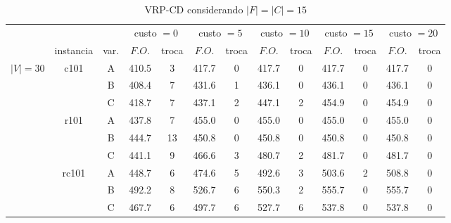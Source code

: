 \documentclass[12pt]{article}
\begin{document}
\begin{table}[!htb]
\centering
\footnotesize
\begin{tabular}{|c|c|c|c|c|c|c|c|c|c|c|c|c|}
\cline{4-13}
\multicolumn{3}{c}{} & \multicolumn{2}{|c}{custo $=0$} & \multicolumn{2}{|c|}{custo $=5$} & \multicolumn{2}{c|}{custo $=10$} & \multicolumn{2}{c|}{custo $=15$} & \multicolumn{2}{|c|}{custo $=20$}\\
\cline{2-13}
\multicolumn{1}{c}{} & \multicolumn{1}{|c}{instancia} & \multicolumn{1}{|c|}{var.} & \multicolumn{1}{|c|}{$F.O.$} & \multicolumn{1}{|c|}{troca} & \multicolumn{1}{|c|}{$F.O.$} & \multicolumn{1}{|c|}{troca} & \multicolumn{1}{|c|}{$F.O.$} & \multicolumn{1}{|c|}{troca} & \multicolumn{1}{|c|}{$F.O.$} & \multicolumn{1}{|c|}{troca} & \multicolumn{1}{|c|}{$F.O.$} & \multicolumn{1}{|c|}{troca} \\
\hline
\multirow{9}{*}{$|V|=30$}
& \multirow{3}{*}{c101} & A & 410.5 & 3 & 417.7 & 0 & 417.7 & 0 & 417.7 & 0 & 417.7 & 0 \\
\cline{3-13}
& \multirow{3}{*}{} & B & 408.4 & 7 & 431.6 & 1 & 436.1 & 0 & 436.1 & 0 & 436.1 & 0 \\
\cline{3-13}
& \multirow{3}{*}{} & C & 418.7 & 7 & 437.1 & 2 & 447.1 & 2 & 454.9 & 0 & 454.9 & 0 \\
\cline{2-13}
& \multirow{3}{*}{r101} & A & 437.8 & 7 & 455.0 & 0 & 455.0 & 0 & 455.0 & 0 & 455.0 & 0 \\
\cline{3-13}
& \multirow{3}{*}{} & B & 444.7 & 13 & 450.8 & 0 & 450.8 & 0 & 450.8 & 0 & 450.8 & 0 \\
\cline{3-13}
& \multirow{3}{*}{} & C & 441.1 & 9 & 466.6 & 3 & 480.7 & 2 & 481.7 & 0 & 481.7 & 0 \\
\cline{2-13}
& \multirow{3}{*}{rc101} & A & 448.7 & 6 & 474.6 & 5 & 492.6 & 3 & 503.6 & 2 & 508.8 & 0 \\
\cline{3-13}
& \multirow{3}{*}{} & B & 492.2 & 8 & 526.7 & 6 & 550.3 & 2 & 555.7 & 0 & 555.7 & 0 \\
\cline{3-13}
& \multirow{3}{*}{} & C & 467.7 & 6 & 497.7 & 6 & 527.7 & 6 & 537.8 & 0 & 537.8 & 0 \\
\hline
\end{tabular}
\caption{VRP-CD considerando $|F|=|C|=15$}
\label{tab:different-dynamic-approaches}
\end{table}
\end{document}
